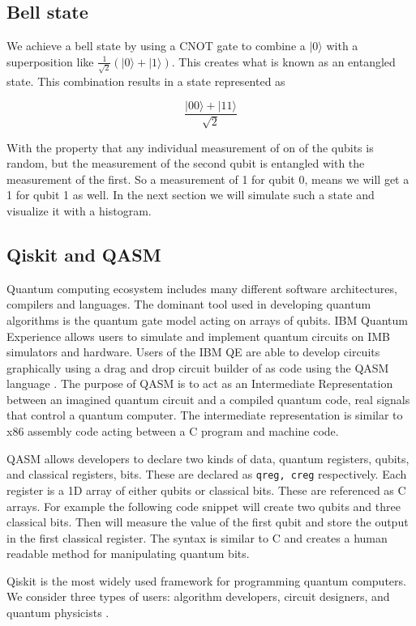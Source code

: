 \documentclass{article}
\newcommand{\ket}[1]{{\lvert #1 \rangle}}
\begin{document}
\subsection{Bell state}

We achieve a bell state by using a CNOT gate to combine a $\ket{0}$ with a superposition like 
$\frac{1}{\sqrt{2}}(\ket{0}+\ket{1})$. This creates what is known as an entangled state. This combination results in a state represented as 

$$
\frac{\ket{00}+\ket{11}}{\sqrt{2}}
$$

With the property that any individual measurement of on of the qubits is random, but the measurement of the second qubit is entangled with the measurement of the first. So a measurement of 1 for qubit 0, means we will get a 1 for qubit 1 as well. In the next section we will simulate such a state and visualize it with a histogram.

\subsection{Qiskit and QASM}
Quantum computing ecosystem includes many different software architectures, compilers and languages. The dominant tool used in developing quantum algorithms is the quantum gate model acting on arrays of qubits. IBM Quantum Experience allows users to simulate and implement quantum circuits on IMB simulators and hardware. Users of the IBM QE are able to develop circuits graphically using a drag and drop circuit builder of as code using the QASM language \cite{b5}. The purpose of QASM is to act as an Intermediate Representation between an imagined quantum circuit and a compiled quantum code, real signals that control a quantum computer. The intermediate representation is similar to x86 assembly code acting between a C program and machine code.

QASM allows developers to declare two kinds of data, quantum registers, qubits, and classical registers, bits. These are declared as \texttt{qreg, creg} respectively. Each register is a 1D array of either qubits or classical bits. These are referenced as C arrays. For example the following code snippet will create two qubits and three classical bits. Then will measure the value of the first qubit and store the output in the first classical register. The syntax is similar to C and creates a human readable method for manipulating quantum bits.

Qiskit is the most widely used framework for programming quantum computers. We consider three types of users: algorithm developers, circuit designers, and quantum physicists \cite{b6}. 
\end{document}
